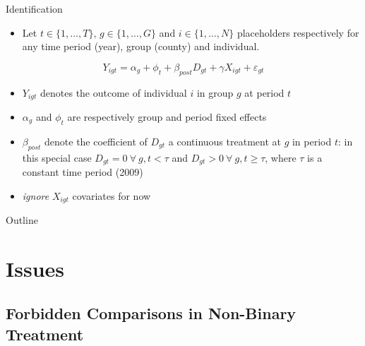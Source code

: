 \documentclass{beamer}
\begin{document}
\begin{frame}{Identification}\label{slide:identification}

    \begin{itemize}
        \item Let $t \in \{1, \dots,  T\}$, $g \in \{1, \dots, G\}$ and $i \in \{1, \dots, N\}$ placeholders respectively for any time period (year), group (county) and individual.
    \end{itemize}

    \begin{equation*}
        Y_{igt} = \alpha_g + \phi_t + \beta_{post} D_{gt} + \gamma X_{igt} + \varepsilon_{gt}\label{eq:twfe}
    \end{equation*}
    
    \begin{itemize}
    
        \item $Y_{igt}$ denotes the outcome of individual $i$ in group $g$ at period $t$
        \item $\alpha_g$ and $\phi_t$ are respectively group and period fixed effects
        \item $\beta_{post}$ denote the coefficient of $D_{gt}$ a continuous treatment at $g$ in period $t$: in this special case $D_{gt} = 0 \ \forall \ g, t < \tau$ and $D_{gt} > 0 \ \forall \ g, t \geq \tau$, where $\tau$ is a constant time period (2009)
        \item \textit{ignore} $X_{igt}$ covariates for now
    
    \end{itemize}
    
\end{frame}



\begin{frame}{Outline}\label{slide:full-outline}
  \tableofcontents
\end{frame}


\section{Issues}

\subsection{Forbidden Comparisons in Non-Binary Treatment}
\end{document}

